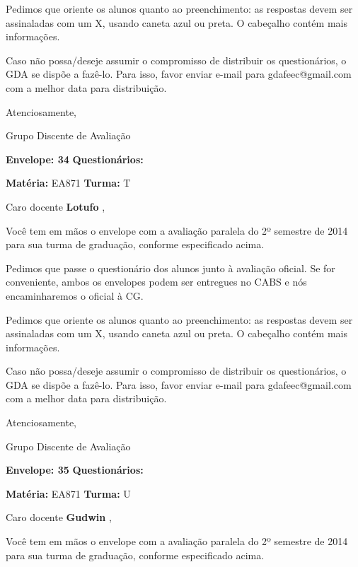 \documentclass[a5paper]{letter}
\begin{document}
Pedimos que oriente os alunos quanto ao preenchimento: as respostas devem ser assinaladas com um X, usando caneta azul ou preta. O cabeçalho contém mais informações.

	Caso não possa/deseje assumir o compromisso de distribuir os questionários, o GDA se dispõe a fazê-lo. Para isso, favor enviar e-mail para gdafeec@gmail.com com a melhor data para distribuição.


Atenciosamente, 

Grupo Discente de Avaliação

\vspace{0.5cm}

{\bf Envelope: 34 }		\hfill	{\bf Questionários:} \hspace{2cm}

\newpage
\thispagestyle{empty}

\hfill {\bf Matéria:} EA871 {\bf Turma:} T

Caro docente {\bf Lotufo }, 

	Você tem em mãos o envelope com a avaliação paralela do 2º semestre de 2014 para sua turma de graduação, conforme especificado acima.

	Pedimos que passe o questionário dos alunos junto à avaliação oficial. Se for conveniente, ambos os envelopes podem ser entregues no CABS e nós encaminharemos o oficial à CG.

Pedimos que oriente os alunos quanto ao preenchimento: as respostas devem ser assinaladas com um X, usando caneta azul ou preta. O cabeçalho contém mais informações.

	Caso não possa/deseje assumir o compromisso de distribuir os questionários, o GDA se dispõe a fazê-lo. Para isso, favor enviar e-mail para gdafeec@gmail.com com a melhor data para distribuição.


Atenciosamente, 

Grupo Discente de Avaliação

\vspace{0.5cm}

{\bf Envelope: 35 }		\hfill	{\bf Questionários:} \hspace{2cm}

\newpage
\thispagestyle{empty}

\hfill {\bf Matéria:} EA871 {\bf Turma:} U

Caro docente {\bf Gudwin }, 

	Você tem em mãos o envelope com a avaliação paralela do 2º semestre de 2014 para sua turma de graduação, conforme especificado acima.
\end{document}
